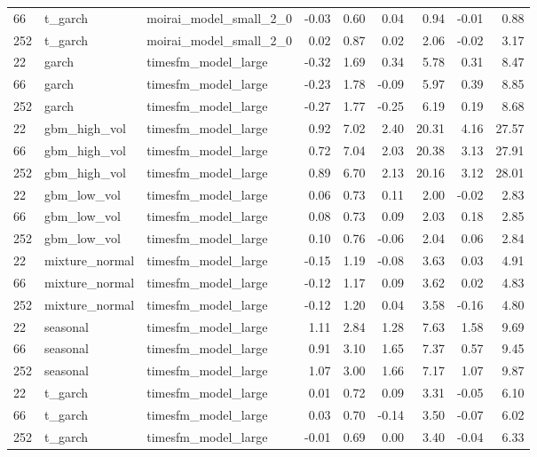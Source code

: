 {\begin{tabular}{lllrrrrrr}
66 & t\_garch & moirai\_model\_small\_2\_0 & -0.03 & 0.60 & 0.04 & 0.94 & -0.01 & 0.88 \\
252 & t\_garch & moirai\_model\_small\_2\_0 & 0.02 & 0.87 & 0.02 & 2.06 & -0.02 & 3.17 \\
\midrule
22 & garch & timesfm\_model\_large & -0.32 & 1.69 & 0.34 & 5.78 & 0.31 & 8.47 \\
66 & garch & timesfm\_model\_large & -0.23 & 1.78 & -0.09 & 5.97 & 0.39 & 8.85 \\
252 & garch & timesfm\_model\_large & -0.27 & 1.77 & -0.25 & 6.19 & 0.19 & 8.68 \\
\midrule
22 & gbm\_high\_vol & timesfm\_model\_large & 0.92 & 7.02 & 2.40 & 20.31 & 4.16 & 27.57 \\
66 & gbm\_high\_vol & timesfm\_model\_large & 0.72 & 7.04 & 2.03 & 20.38 & 3.13 & 27.91 \\
252 & gbm\_high\_vol & timesfm\_model\_large & 0.89 & 6.70 & 2.13 & 20.16 & 3.12 & 28.01 \\
\midrule
22 & gbm\_low\_vol & timesfm\_model\_large & 0.06 & 0.73 & 0.11 & 2.00 & -0.02 & 2.83 \\
66 & gbm\_low\_vol & timesfm\_model\_large & 0.08 & 0.73 & 0.09 & 2.03 & 0.18 & 2.85 \\
252 & gbm\_low\_vol & timesfm\_model\_large & 0.10 & 0.76 & -0.06 & 2.04 & 0.06 & 2.84 \\
\midrule
22 & mixture\_normal & timesfm\_model\_large & -0.15 & 1.19 & -0.08 & 3.63 & 0.03 & 4.91 \\
66 & mixture\_normal & timesfm\_model\_large & -0.12 & 1.17 & 0.09 & 3.62 & 0.02 & 4.83 \\
252 & mixture\_normal & timesfm\_model\_large & -0.12 & 1.20 & 0.04 & 3.58 & -0.16 & 4.80 \\
\midrule
22 & seasonal & timesfm\_model\_large & 1.11 & 2.84 & 1.28 & 7.63 & 1.58 & 9.69 \\
66 & seasonal & timesfm\_model\_large & 0.91 & 3.10 & 1.65 & 7.37 & 0.57 & 9.45 \\
252 & seasonal & timesfm\_model\_large & 1.07 & 3.00 & 1.66 & 7.17 & 1.07 & 9.87 \\
\midrule
22 & t\_garch & timesfm\_model\_large & 0.01 & 0.72 & 0.09 & 3.31 & -0.05 & 6.10 \\
66 & t\_garch & timesfm\_model\_large & 0.03 & 0.70 & -0.14 & 3.50 & -0.07 & 6.02 \\
252 & t\_garch & timesfm\_model\_large & -0.01 & 0.69 & 0.00 & 3.40 & -0.04 & 6.33 \\

\end{tabular}}
